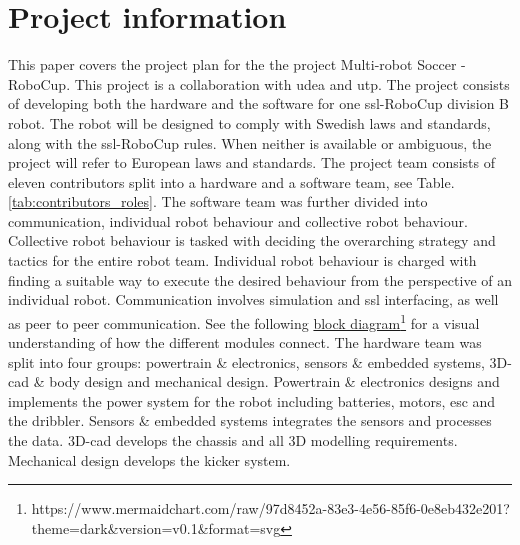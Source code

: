 \section{Project information}
\label{section:project_information}

This paper covers the project plan for the the project Multi-robot Soccer - RoboCup. This project is a collaboration with \ac{udea} and \ac{utp}. The project consists of developing both the hardware and the software for one \ac{ssl}-RoboCup division B robot. The robot will be designed to comply with Swedish laws and standards, along with the \ac{ssl}-RoboCup rules. When neither is available or ambiguous, the project will refer to European laws and standards.
The project team consists of eleven contributors split into a hardware and a software team, see Table.\:\ref{tab:contributors_roles}. 
The software team was further divided into communication, individual robot behaviour and collective robot behaviour. Collective robot behaviour is tasked with deciding the overarching strategy and tactics for the entire robot team. Individual robot behaviour is charged with finding a suitable way to execute the desired behaviour from the perspective of an individual robot. Communication involves simulation and \ac{ssl} interfacing, as well as peer to peer communication. See the following \href{https://www.mermaidchart.com/raw/97d8452a-83e3-4e56-85f6-0e8eb432e201?theme=dark&version=v0.1&format=svg}{block diagram}\footnote{https://www.mermaidchart.com/raw/97d8452a-83e3-4e56-85f6-0e8eb432e201?theme=dark\&version=v0.1\&format=svg} for a visual understanding of how the different modules connect.
The hardware team was split into four groups: powertrain \& electronics, sensors \& embedded systems, 3D-\acs{cad} \& body design and mechanical design. Powertrain \& electronics designs and implements the power system for the robot including batteries, motors, \ac{esc} and the dribbler. Sensors \& embedded systems integrates the sensors and processes the data. 3D-\acs{cad} develops the chassis and all 3D modelling requirements. Mechanical design develops the kicker system.

